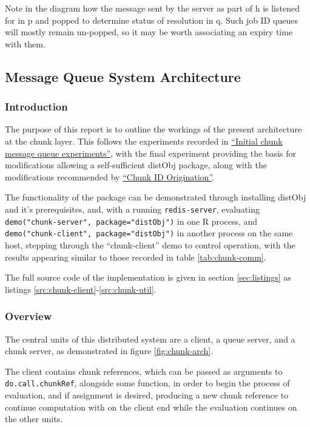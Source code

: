 Note in the diagram how the message sent by the server as part of
\textcolor{dark2-1}{h} is listened for in \textcolor{dark2-6}{p} and popped to
determine status of resolution in \textcolor{dark2-6}{q}.
Such job ID queues will mostly remain un-popped, so it may be worth associating
an expiry time with them.

\subsection{Message Queue System Architecture}

\subsubsection{Introduction}

The purpose of this report is to outline the workings of the present
architecture at the chunk layer.
This follows the experiments recorded in
\href{init-chunk-msg-q-exp.pdf}{``Initial chunk message queue experiments''},
with the final experiment providing the basis for modifications allowing a
self-sufficient distObj package, along with the modifications recommended by
\href{chunk-id-orig.pdf}{``Chunk ID Origination''}.

The functionality of the package can be demonstrated through installing distObj
and it's prerequisites, and, with a running \texttt{redis-server}, evaluating
\texttt{demo("chunk-server", package="distObj")} in one R
process, and \texttt{demo("chunk-client", package="distObj")} in
another process on the same host, stepping through the ``chunk-client'' demo to
control operation, with the results appearing similar to those recorded in
table \ref{tab:chunk-comm}.

The full source code of the implementation is given in section
\ref{sec:listings} as listings \ref{src:chunk-client}-\ref{src:chunk-util}.

\subsubsection{Overview}

The central units of this distributed system are a client, a queue server, and
a chunk server, as demonstrated in figure \ref{fig:chunk-arch}.

The client contains chunk references, which can be passed as arguments to
\texttt{do.call.chunkRef}, alongside some function, in order to begin the
process of evaluation, and if assignment is desired, producing a new chunk
reference to continue computation with on the client end while the evaluation
continues on the other units.

